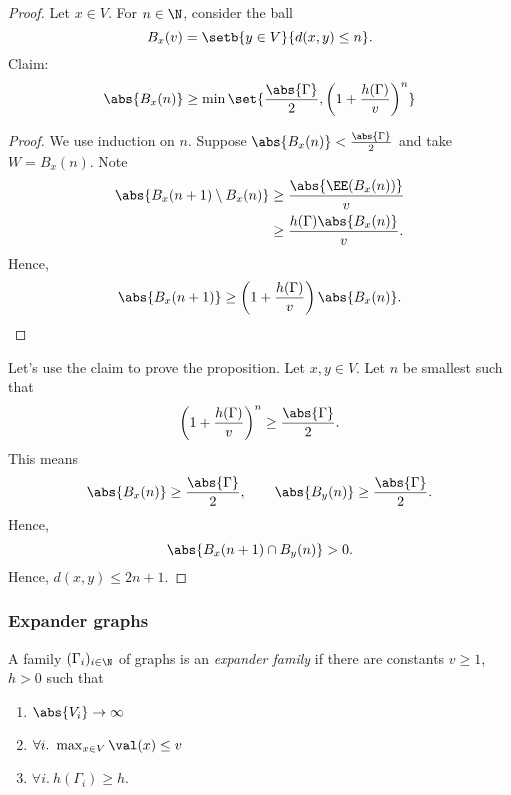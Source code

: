 \begin{proof}
    Let $x \in V$. For $n \in \N$, consider the ball 
    \[
        B_x(v) =  \setb{y \in V}{d(x,y) \le n}.
    \]
    Claim: 
    \[
        \abs{B_x(n)} \ge \min\set{\frac{\abs{\Gamma}}{2}, \left(1+\frac{h(\Gamma)}{v}\right)^n}
    \]%
    \begin{proof}
        We use induction on $n$. Suppose 
        $\abs{B_x(n)} < \frac{\abs{\Gamma}}{2}$ and take 
        $W = B_x(n)$. Note 
        \begin{align*}
            \abs{B_x(n+1) \setminus B_x(n)} 
            &\ge \frac{\abs{\EE(B_x(n))}}{v} \\
            &\ge \frac{h(\Gamma) \abs{B_x(n)}}{v}.
        \end{align*}
        Hence,
        \[
            \abs{B_x(n+1)} \ge
            \left(1 + \frac{h(\Gamma)}{v}\right)\abs{B_x(n)}. \qedhere
        \]        
    \end{proof}
    Let's use the claim to prove the proposition. 
    Let $x,y \in V$. Let $n$ be smallest such that
    \[
        \left(1 + \frac{h(\Gamma)}{v}\right)^n \ge
        \frac{\abs{\Gamma}}{2}. %
    \]
    This means 
    \[
    \abs{B_x(n)} \ge \frac{\abs{\Gamma}}{2}, \qquad
    \abs{B_y(n)} \ge  \frac{\abs{\Gamma}}{2}.
    \]
    Hence,
    \[
        \abs{B_x(n+1) \cap B_y(n)} > 0.
    \]
    Hence, $d(x,y) \le 2n + 1$.
\end{proof}

\subsubsection*{Expander graphs}

\begin{definition}
    A family $(\Gamma_i)_{i \in \N}$ of 
    graphs is an \emph{expander family}
    if there are constants $v \ge 1$, $h > 0$ such that
    \begin{enumerate}
        \item $\abs{V_i} \to \infty$ %
        \item $\forall i.~\max_{x \in V}\val(x) \le v$
        \item $\forall i.~h(\Gamma_i) \ge h$.
    \end{enumerate}
\end{definition}


